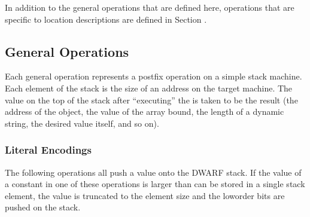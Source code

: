 In addition to the
general operations that are defined here, operations that are
specific to location descriptions are defined in 
Section .

\subsection{General Operations}
\label{chap:generaloperations}
Each general operation represents a postfix operation on
a simple stack machine. Each element of the stack is the
size of an address on the target machine. The value on the
top of the stack after ``executing'' the 
is 
taken to be the result (the address of the object, the
value of the array bound, the length of a dynamic string,
the desired value itself, and so on).

\subsubsection{Literal Encodings}
\label{chap:literalencodings}
The 
following operations all push a value onto the DWARF
stack. 
If the value of a constant in one of these operations
is larger than can be stored in a single stack element, the
value is truncated to the element size and the low\dash order bits
are pushed on the stack.

